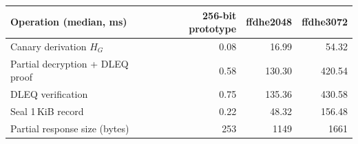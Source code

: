 \begin{tabular}{@{}lrrr@{}}
\toprule
Operation (median, ms) & 256-bit prototype & ffdhe2048 & ffdhe3072\\
\midrule
Canary derivation $H_G$ & 0.08 & 16.99 & 54.32\\
Partial decryption + DLEQ proof & 0.58 & 130.30 & 420.54\\
DLEQ verification & 0.75 & 135.36 & 430.58\\
Seal 1\,KiB record & 0.22 & 48.32 & 156.48\\
Partial response size (bytes) & 253 & 1149 & 1661\\
\bottomrule
\end{tabular}
